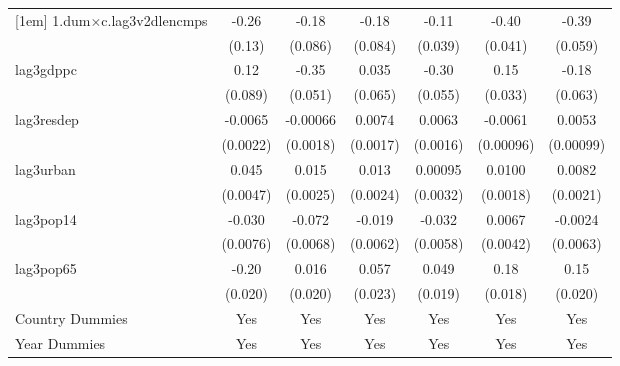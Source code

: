 \begin{table}[htbp]
\begin{tabular}{l*{6}{c}}
[1em]
1.dum$\times$c.lag3v2dlencmps&       -0.26\sym{*}  &       -0.18\sym{*}  &       -0.18\sym{*}  &       -0.11\sym{**} &       -0.40\sym{***}&       -0.39\sym{***}\\
            &      (0.13)         &     (0.086)         &     (0.084)         &     (0.039)         &     (0.041)         &     (0.059)         \\
[1em]
lag3gdppc   &        0.12         &       -0.35\sym{***}&       0.035         &       -0.30\sym{***}&        0.15\sym{***}&       -0.18\sym{**} \\
            &     (0.089)         &     (0.051)         &     (0.065)         &     (0.055)         &     (0.033)         &     (0.063)         \\
[1em]
lag3resdep  &     -0.0065\sym{**} &    -0.00066         &      0.0074\sym{***}&      0.0063\sym{***}&     -0.0061\sym{***}&      0.0053\sym{***}\\
            &    (0.0022)         &    (0.0018)         &    (0.0017)         &    (0.0016)         &   (0.00096)         &   (0.00099)         \\
[1em]
lag3urban   &       0.045\sym{***}&       0.015\sym{***}&       0.013\sym{***}&     0.00095         &      0.0100\sym{***}&      0.0082\sym{***}\\
            &    (0.0047)         &    (0.0025)         &    (0.0024)         &    (0.0032)         &    (0.0018)         &    (0.0021)         \\
[1em]
lag3pop14   &      -0.030\sym{***}&      -0.072\sym{***}&      -0.019\sym{**} &      -0.032\sym{***}&      0.0067         &     -0.0024         \\
            &    (0.0076)         &    (0.0068)         &    (0.0062)         &    (0.0058)         &    (0.0042)         &    (0.0063)         \\
[1em]
lag3pop65   &       -0.20\sym{***}&       0.016         &       0.057\sym{*}  &       0.049\sym{*}  &        0.18\sym{***}&        0.15\sym{***}\\
            &     (0.020)         &     (0.020)         &     (0.023)         &     (0.019)         &     (0.018)         &     (0.020)         \\
[1em]
Country Dummies &         Yes         &         Yes         &         Yes         &         Yes         &         Yes         &         Yes         \\
[1em]
Year Dummies &         Yes         &         Yes         &         Yes         &         Yes         &         Yes         &         Yes         \\

\end{tabular}
\end{table}
